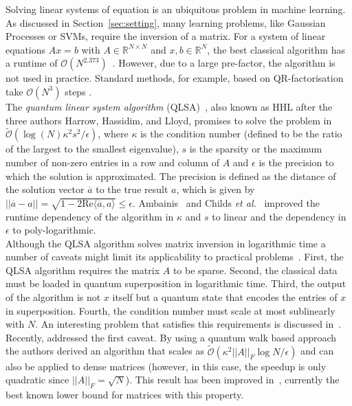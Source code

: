 \documentclass[a4paper, 11pt]{article}
\newcommand{\Ord}[1]{\mathcal{O}(#1)}
\newcommand{\tOrd}[1]{\tilde{\mathcal{O}}(#1)}
\begin{document}
Solving linear systems of equation is an ubiquitous problem in machine learning. As discussed in Section~\ref{sec:setting}, many learning problems, like Gaussian Processes or SVMs, require the inversion of a matrix. For a system of linear equations $A x = b$ with $A \in \mathbb{R}^{N \times N}$ and $x,b \in \mathbb{R}^N$, the best classical algorithm has a runtime of $\Ord{N^{2.373}}$~\cite{coppersmith1990matrix}. However, due to a large pre-factor, the algorithm is not used in practice. Standard methods, for example, based on QR-factorisation take $\Ord{N^3}$ steps \cite{golub2012matrix}.\\

The \textit{quantum linear system algorithm} (QLSA)~\cite{harrow2009quantum}, also known as HHL after the three authors Harrow, Hassidim, and Lloyd, promises to solve the problem in $\tOrd{\log (N) \kappa^{2} s^{2} /\epsilon}$, where $\kappa$ is the condition number (defined to be the ratio of the largest to the smallest eigenvalue), $s$ is the sparsity or the maximum number of non-zero entries in a row and column of $A$ and $\epsilon$ is the precision to which the solution is approximated. The precision is defined as the distance of the solution vector $\overline{a}$ to the true result $a$, which is given by $|| \overline{ a} -  a || = \sqrt{1-2 \text{Re} \langle \overline{ a},  a \rangle} \leq \epsilon$. Ambainis~\cite{ambainis2012variable} and Childs \textit{et al.}~\cite{childs2015quantum} improved the runtime dependency of the algorithm in $\kappa$ and $s$ to linear and the dependency in $\epsilon$ to poly-logarithmic.\\

Although the QLSA algorithm solves matrix inversion in logarithmic time a number of caveats might limit its applicability to practical problems~\cite{aaronson2015read}. First, the QLSA algorithm requires the matrix $A$ to be sparse. Second, the classical data must be loaded in quantum superposition in logarithmic time. Third, the output of the algorithm is not $x$ itself but a quantum state that encodes the entries of $x$ in superposition. Fourth, the condition number must scale at most sublinearly with $N$. An interesting problem that satisfies this requirements is discussed in~\cite{clader2013preconditioned}.\\ 

Recently, \cite{wossnig2017quantum} addressed the first caveat. By using a quantum walk based approach the authors derived an algorithm that scales as $\tOrd{\kappa^{2} ||A||_F \log N/\epsilon}$ and can also be applied to dense matrices (however, in this case, the speedup is only quadratic since $||A||_F=\sqrt{N}$). This result has been improved  in~\cite{kerenidis2017quantum}, currently the best known lower bound for matrices with this property.\\
\end{document}
